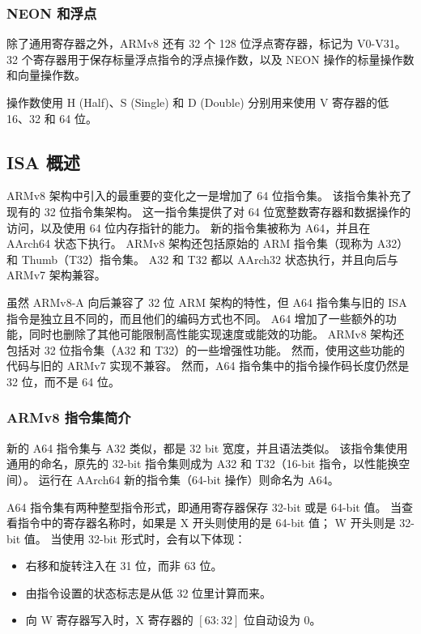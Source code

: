 \subsubsection{NEON 和浮点}

除了通用寄存器之外，ARMv8 还有 32 个 128 位浮点寄存器，标记为 V0-V31。
32 个寄存器用于保存标量浮点指令的浮点操作数，以及 NEON 操作的标量操作数和向量操作数。

操作数使用 H (Half)、S (Single) 和 D (Double) 分别用来使用 V 寄存器的低 16、32 和 64 位。

\subsection{ISA 概述}

ARMv8 架构中引入的最重要的变化之一是增加了 64 位指令集。
该指令集补充了现有的 32 位指令集架构。
这一指令集提供了对 64 位宽整数寄存器和数据操作的访问，以及使用 64 位内存指针的能力。
新的指令集被称为 A64，并且在 AArch64 状态下执行。
ARMv8 架构还包括原始的 ARM 指令集（现称为 A32）和 Thumb（T32）指令集。
A32 和 T32 都以 AArch32 状态执行，并且向后与 ARMv7 架构兼容。

虽然 ARMv8-A 向后兼容了 32 位 ARM 架构的特性，但 A64 指令集与旧的 ISA 指令是独立且不同的，而且他们的编码方式也不同。
A64 增加了一些额外的功能，同时也删除了其他可能限制高性能实现速度或能效的功能。
ARMv8 架构还包括对 32 位指令集（A32 和 T32）的一些增强性功能。
然而，使用这些功能的代码与旧的 ARMv7 实现不兼容。
然而，A64 指令集中的指令操作码长度仍然是 32 位，而不是 64 位。

\subsubsection{ARMv8 指令集简介}

新的 A64 指令集与 A32 类似，都是 32 bit 宽度，并且语法类似。
该指令集使用通用的命名，原先的 32-bit 指令集则成为 A32 和 T32（16-bit 指令，以性能换空间）。
运行在 AArch64 新的指令集（64-bit 操作）则命名为 A64。

A64 指令集有两种整型指令形式，即通用寄存器保存 32-bit 或是 64-bit 值。
当查看指令中的寄存器名称时，如果是 X 开头则使用的是 64-bit 值；
W 开头则是 32-bit 值。
当使用 32-bit 形式时，会有以下体现：
\begin{itemize}
  \item 右移和旋转注入在 31 位，而非 63 位。
  \item 由指令设置的状态标志是从低 32 位里计算而来。
  \item 向 W 寄存器写入时，X 寄存器的 $[63:32]$ 位自动设为 0。
\end{itemize}

